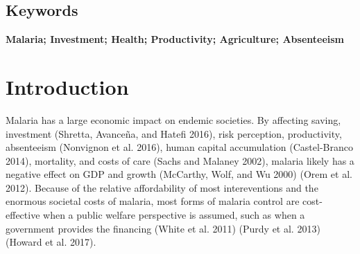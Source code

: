 \documentclass[]{article}
\begin{document}
\vspace{20mm}

\noindent{}

\vfill
\null

\subsection*{Keywords}

\textbf{Malaria; Investment; Health; Productivity; Agriculture; Absenteeism}

\vspace{3mm}

\newpage

\section{Introduction}\label{introduction}

Malaria has a large economic impact on endemic societies. By affecting
saving, investment (Shretta, Avanceña, and Hatefi 2016), risk
perception, productivity, absenteeism (Nonvignon et al. 2016), human
capital accumulation (Castel-Branco 2014), mortality, and costs of care
(Sachs and Malaney 2002), malaria likely has a negative effect on GDP
and growth (McCarthy, Wolf, and Wu 2000) (Orem et al. 2012). Because of
the relative affordability of most intereventions and the enormous
societal costs of malaria, most forms of malaria control are
cost-effective when a public welfare perspective is assumed, such as
when a government provides the financing (White et al. 2011) (Purdy et
al. 2013) (Howard et al. 2017).
\end{document}
